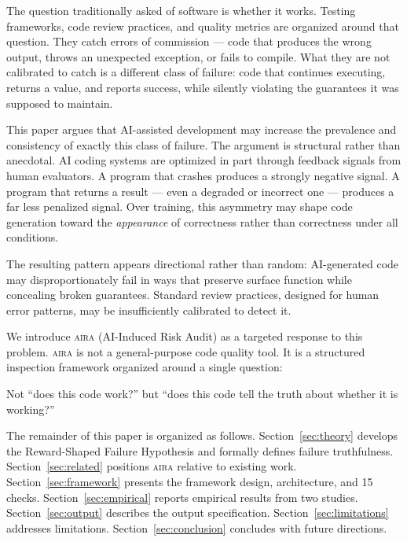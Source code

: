 \documentclass[11pt]{article}
\newenvironment{quotebox}{%
  \begin{tcolorbox}[
    enhanced,
    colback=aira-light,
    colframe=aira-mid,
    leftrule=4pt, rightrule=0pt, toprule=0pt, bottomrule=0pt,
    arc=0pt,
    left=6pt, right=6pt, top=4pt, bottom=4pt
  ]
  \itshape
}{%
  \end{tcolorbox}
}
\newcommand{\aira}{\textsc{aira}}
\begin{document}
The question traditionally asked of software is whether it works. Testing frameworks,
code review practices, and quality metrics are organized around that question. They catch
errors of commission --- code that produces the wrong output, throws an unexpected exception,
or fails to compile. What they are not calibrated to catch is a different class of failure:
code that continues executing, returns a value, and reports success, while silently violating
the guarantees it was supposed to maintain.

This paper argues that AI-assisted development may increase the prevalence and consistency
of exactly this class of failure. The argument is structural rather than anecdotal. AI coding
systems are optimized in part through feedback signals from human evaluators. A program that
crashes produces a strongly negative signal. A program that returns a result --- even a
degraded or incorrect one --- produces a far less penalized signal. Over training, this
asymmetry may shape code generation toward the \emph{appearance} of correctness rather than
correctness under all conditions.

The resulting pattern appears directional rather than random: AI-generated code may
disproportionately fail in ways that preserve surface function while concealing broken
guarantees. Standard review practices, designed for human error patterns, may be
insufficiently calibrated to detect it.

We introduce \aira{} (AI-Induced Risk Audit) as a targeted response to this problem. \aira{}
is not a general-purpose code quality tool. It is a structured inspection framework organized
around a single question:

\begin{quotebox}
Not ``does this code work?'' but ``does this code tell the truth about whether it is working?''
\end{quotebox}

The remainder of this paper is organized as follows. Section~\ref{sec:theory} develops the
Reward-Shaped Failure Hypothesis and formally defines failure truthfulness.
Section~\ref{sec:related} positions \aira{} relative to existing work.
Section~\ref{sec:framework} presents the framework design, architecture, and 15 checks.
Section~\ref{sec:empirical} reports empirical results from two studies.
Section~\ref{sec:output} describes the output specification.
Section~\ref{sec:limitations} addresses limitations.
Section~\ref{sec:conclusion} concludes with future directions.
\end{document}

